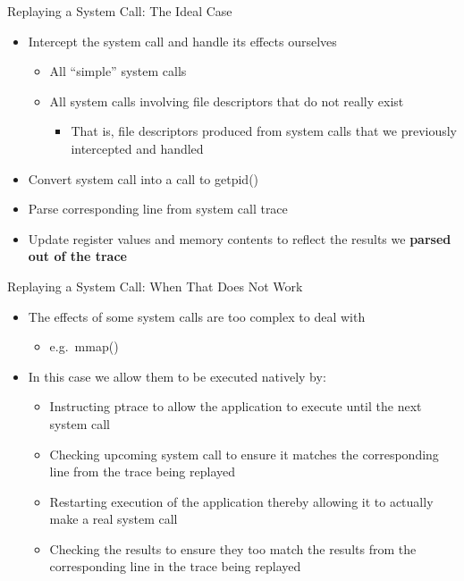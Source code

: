 \documentclass[pdf]{beamer}
\begin{document}
\begin{frame}{Replaying a System Call: The Ideal Case}
  \begin{itemize}
  \item{Intercept the system call and handle its effects
      ourselves}
    \begin{itemize}
    \item{All ``simple'' system calls}
    \item{All system calls involving file descriptors that do not really exist}
      \begin{itemize}
      \item{That is, file descriptors produced from system calls that we
          previously intercepted and handled}
      \end{itemize}
    \end{itemize}
  \item{Convert system call into a call to getpid()}
  \item{Parse corresponding line from system call trace}
  \item{Update register values and memory contents to reflect the results we
      \textbf{parsed out of the trace}}
  \end{itemize}
\end{frame}


\begin{frame}{Replaying a System Call: When That Does Not Work}
  \begin{itemize}
  \item{The effects of some system calls are too complex to deal with}
    \begin{itemize}
    \item{e.g.\ mmap()}
    \end{itemize}
  \item{In this case we allow them to be executed natively by:}
    \begin{itemize}
      \item{Instructing ptrace to allow the application to execute until the
          next system call}
      \item{Checking upcoming system call to ensure it matches the corresponding
          line from the trace being replayed}
      \item{Restarting execution of the application thereby allowing it to
          actually make a real system call}
      \item{Checking the results to ensure they too match the results from the
          corresponding line in the trace being replayed}
    \end{itemize}
  \end{itemize}
\end{frame}
\end{document}
